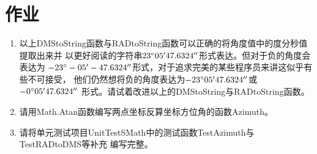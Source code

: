 \section*{作业}

\begin{enumerate}
\item 以上DMStoString函数与RADtoString函数可以正确的将角度值中的度分秒值提取出来并
以更好阅读的字符串$23^\circ 05'47.6324''$形式表达。但对于负的角度会表达为
$-23^\circ -05'-47.6324''$形式，对于追求完美的某些程序员来讲这似乎有些不可接受，
他们仍然想将负的角度表达为$-23^\circ 05'47.6324''$或$-0^\circ 05'47.6324''$
形式。请试着改进以上的DMStoString与RADtoString函数。
    
\item 请用Math.Atan函数编写两点坐标反算坐标方位角的函数Azimuth。

\item 请将单元测试项目UnitTestSMath中的测试函数TestAzimuth与TestRADtoDMS等补充
编写完整。
\end{enumerate}